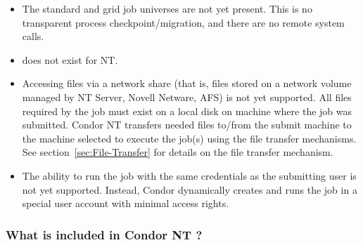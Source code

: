 \begin{itemize}

\item The standard and grid job universes are not yet present.  
This is no
transparent process checkpoint/migration, and there are no
remote system calls.

\item {} does not exist for NT.

\item Accessing files via a network share (that is,
files stored on a network volume managed by NT Server, Novell Netware, AFS)
is not yet supported.
All files required by the job must exist on a local disk on
machine where the job was submitted.
Condor NT transfers 
needed files to/from the submit machine to the machine selected to
execute the job(s) using the file transfer mechanisms.
See section~\ref{sec:File-Transfer} for details on the
file transfer mechanism.

\item The ability to run the job with the same credentials as the submitting
user is not yet supported.  Instead, Condor dynamically creates and runs the
job in a special user account with minimal access rights.

\end{itemize}

\subsubsection{What is included in Condor NT \VersionNotice?}

